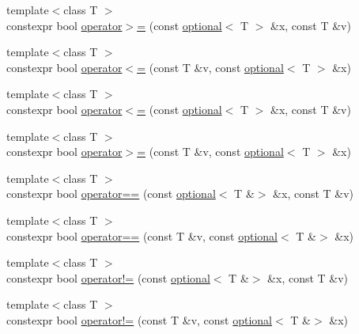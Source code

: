 \begin{DoxyCompactItemize}
\item 
{\footnotesize template$<$class T $>$ }\\constexpr bool \mbox{\hyperlink{namespacestd_1_1experimental_a3209ada3ae8542ffbdfcc7e7d35f19a5}{operator$>$=}} (const \mbox{\hyperlink{classstd_1_1experimental_1_1optional}{optional}}$<$ T $>$ \&x, const T \&v)
\item 
{\footnotesize template$<$class T $>$ }\\constexpr bool \mbox{\hyperlink{namespacestd_1_1experimental_a4482ae3dc6aad99b5d17a3a2c0dfe30f}{operator$<$=}} (const T \&v, const \mbox{\hyperlink{classstd_1_1experimental_1_1optional}{optional}}$<$ T $>$ \&x)
\item 
{\footnotesize template$<$class T $>$ }\\constexpr bool \mbox{\hyperlink{namespacestd_1_1experimental_a9dd11e02b37f5d3e9c09a29c7ea7024c}{operator$<$=}} (const \mbox{\hyperlink{classstd_1_1experimental_1_1optional}{optional}}$<$ T $>$ \&x, const T \&v)
\item 
{\footnotesize template$<$class T $>$ }\\constexpr bool \mbox{\hyperlink{namespacestd_1_1experimental_a0e2303b05ab975b9dd1a53c198bf2e45}{operator$>$=}} (const T \&v, const \mbox{\hyperlink{classstd_1_1experimental_1_1optional}{optional}}$<$ T $>$ \&x)
\item 
{\footnotesize template$<$class T $>$ }\\constexpr bool \mbox{\hyperlink{namespacestd_1_1experimental_a5e8049d714e136368d3f1cc2cc7fc787}{operator==}} (const \mbox{\hyperlink{classstd_1_1experimental_1_1optional}{optional}}$<$ T \&$>$ \&x, const T \&v)
\item 
{\footnotesize template$<$class T $>$ }\\constexpr bool \mbox{\hyperlink{namespacestd_1_1experimental_ad874f9e082998b503ad0f7bb0376782e}{operator==}} (const T \&v, const \mbox{\hyperlink{classstd_1_1experimental_1_1optional}{optional}}$<$ T \&$>$ \&x)
\item 
{\footnotesize template$<$class T $>$ }\\constexpr bool \mbox{\hyperlink{namespacestd_1_1experimental_a32e202bafe91eccccc3d34ef53bc3f01}{operator!=}} (const \mbox{\hyperlink{classstd_1_1experimental_1_1optional}{optional}}$<$ T \&$>$ \&x, const T \&v)
\item 
{\footnotesize template$<$class T $>$ }\\constexpr bool \mbox{\hyperlink{namespacestd_1_1experimental_aa2bc218261382e5d1dbb90aee5930580}{operator!=}} (const T \&v, const \mbox{\hyperlink{classstd_1_1experimental_1_1optional}{optional}}$<$ T \&$>$ \&x)

\end{DoxyCompactItemize}
